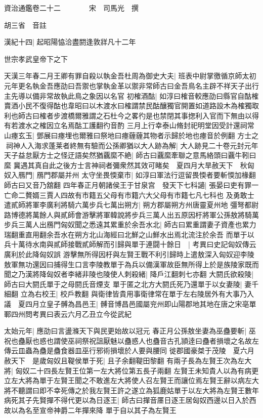 資治通鑑卷二十二　　　　宋　司馬光　撰

胡三省　音註

漢紀十四|{
	起昭陽恊洽盡閼逢敦牂凡十二年}


世宗孝武皇帝下之下

天漢三年春二月王卿有罪自殺以執金吾杜周為御史大夫|{
	班表中尉掌徼循京師太初元年更名執金吾應劭曰吾禦也掌執金革以禦非常師古曰金吾鳥名主辟不祥天子出行主先導以備非常故執此鳥之象因以名官}
初榷酒酤|{
	如淳曰榷音較應劭曰縣官自酤榷賣酒小民不復得酤也韋昭曰以木渡水曰榷謂禁民酤釀獨官開置如道路設木為榷獨取利也師古曰榷者步渡橋爾雅謂之石杜今之畧彴是也禁閉其事揔利入官而下無由以得有若渡水之榷因立名焉酤工護翻彴音酌}
三月上行幸泰山脩封祀明堂因受計還祠常山瘞玄玉|{
	鄧展曰瘞埋也爾雅曰祭地曰瘞薶薶其物者示歸於地也瘞音於例翻}
方士之祠神人入海求蓬莱者終無有驗而公孫卿猶以大人跡為解|{
	大人跡見二十卷元封元年}
天子益怠厭方士之怪迂語矣然猶覊縻不絶|{
	師古曰覊縻牽聯之意馬絡頭曰覊牛靷曰縻}
冀遇其真自此之後方士言神祠者彌衆然其效可睹矣　夏四月大旱赦天下　秋匈奴入鴈門|{
	鴈門郡屬并州}
太守坐畏愞棄市|{
	如淳曰軍法行逗留畏愞者要斬愞加椽翻師古曰又音乃舘翻}
四年春正月朝諸侯王于甘泉宫　發天下七科讁|{
	張晏曰吏有罪一亡命二贅婿三賈人四故有市籍五父母有市籍六大父母有市籍七凡七科也}
及勇敢士遣貳師將軍李廣利將騎六萬步兵七萬出朔方|{
	朔方郡屬朔方州唐靈夏州地}
彊弩都尉路博德將萬餘人與貳師會游擊將軍韓說將步兵三萬人出五原因杅將軍公孫敖將騎萬步兵三萬人出鴈門匈奴聞之悉遠其累重於余吾水北|{
	師古曰累重謂妻子資產也累力瑞翻重直用翻余吾水在朔方北山海經曰北鮮之山鮮水出焉北流注於余吾}
而單于以兵十萬待水南與貳師接戰貳師解而引歸與單于連闘十餘日　|{
	考異曰史記匈奴傳云廣利於此降匈奴誤}
游擊無所得因杅與左賢王戰不利引歸時上遣敖深入匈奴迎李陵敖軍無功還因曰捕得生口言李陵教單于為兵以備漢軍故臣無所得上於是族陵家既而聞之乃漢將降匈奴者李緒非陵也陵使人刺殺緒|{
	降戶江翻刺七亦翻}
大閼氏欲殺陵|{
	師古曰大閼氏單于之母閼氏音煙支}
單于匿之北方大閼氏死乃還單于以女妻陵|{
	妻千細翻}
立為右校王|{
	校戶教翻}
與衛律皆貴用事衛律常在單于左右陵居外有大事乃入議　夏四月立皇子髆為昌邑王|{
	髆音博昌邑國屬兖州即山陽郡地其地在唐之宋亳單鄆四州問考異曰表云六月乙丑立今從武紀}


太始元年|{
	應劭曰言盪滌天下與民更始故以冠元}
春正月公孫敖坐妻為巫蠱要斬|{
	巫祝也蠱厭也惑也謂使巫祠祭祝詛厭魅以蠱惑人也蠱音古孔頴逹曰蠱者損壞之名故左傳云皿蟲為蠱是蠱食器皿巫行邪術損壞於人要與腰同}
徙郡國豪桀于茂陵　夏六月赦天下　是歲匈奴且鞮侯單于死|{
	且子余翻鞮田黎翻}
有兩子長為左賢王次為左大將|{
	匈奴二十四長左賢王位第一左大將位第五長子兩翻}
左賢王未知貴人以為有病更立左大將為單于左賢王聞之不敢進左大將使人召左賢王而讓位焉左賢王辭以病左大將不聽謂曰即不幸死傳之於我左賢王許之遂立為狐鹿姑單于以左大將為左賢王數年病死其子先賢撣不得代更以為日逐王|{
	師古曰撣音㕓日逐王居匈奴西邊以日入於西故以為名至宣帝神爵二年撣來降}
單于自以其子為左賢王

